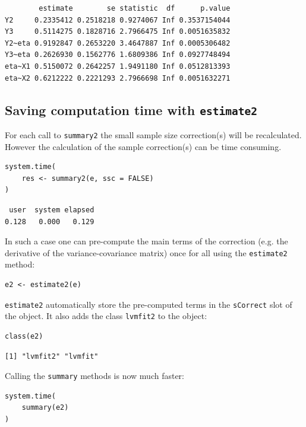 \documentclass[12pt]{article}
\begin{document}
\begin{verbatim}
        estimate        se statistic  df      p.value
Y2     0.2335412 0.2518218 0.9274067 Inf 0.3537154044
Y3     0.5114275 0.1828716 2.7966475 Inf 0.0051635832
Y2~eta 0.9192847 0.2653220 3.4647887 Inf 0.0005306482
Y3~eta 0.2626930 0.1562776 1.6809386 Inf 0.0927748494
eta~X1 0.5150072 0.2642257 1.9491180 Inf 0.0512813393
eta~X2 0.6212222 0.2221293 2.7966698 Inf 0.0051632271
\end{verbatim}

\subsection{Saving computation time with \texttt{estimate2}}
\label{sec:orgaa5d2f3}
For each call to \texttt{summary2} the small sample size correction(s) will
be recalculated. However the calculation of the sample correction(s)
can be time consuming.
\lstset{language=r,label= ,caption= ,captionpos=b,numbers=none}
\begin{lstlisting}
system.time(
    res <- summary2(e, ssc = FALSE)
)
\end{lstlisting}

\begin{verbatim}
 user  system elapsed 
0.128   0.000   0.129
\end{verbatim}


In such a case one can pre-compute the main terms of the correction
(e.g. the derivative of the variance-covariance matrix) once for all
using the \texttt{estimate2} method:
\lstset{language=r,label= ,caption= ,captionpos=b,numbers=none}
\begin{lstlisting}
e2 <- estimate2(e)
\end{lstlisting}

\texttt{estimate2} automatically store the pre-computed terms in the
\texttt{sCorrect} slot of the object. It also adds the class \texttt{lvmfit2} to the
object:
\lstset{language=r,label= ,caption= ,captionpos=b,numbers=none}
\begin{lstlisting}
class(e2)
\end{lstlisting}

\begin{verbatim}
[1] "lvmfit2" "lvmfit"
\end{verbatim}


Calling the  \texttt{summary} methods is now much faster:
\lstset{language=r,label= ,caption= ,captionpos=b,numbers=none}
\begin{lstlisting}
system.time(
    summary(e2)
)
\end{lstlisting}
\end{document}
